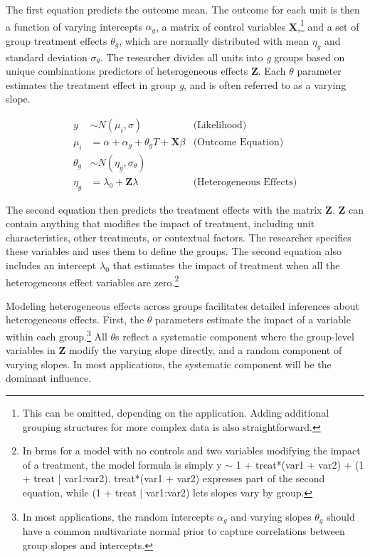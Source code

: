 \documentclass[12pt]{article}
\begin{document}
The first equation predicts the outcome mean. 
The outcome for each unit is then a function of varying intercepts $\alpha_g$, a matrix of control variables \textbf{X},\footnote{This can be omitted, depending on the application. Adding additional grouping structures for more complex data is also straightforward.} and a set of group treatment effects $\theta_g$, which are normally distributed with mean $\eta_g$ and standard deviation $\sigma_\theta$. 
The researcher divides all units into \textit{g} groups based on unique combinations predictors of heterogeneous effects \textbf{Z}. 
Each $\theta$ parameter estimates the treatment effect in group \textit{g}, and is often referred to as a varying slope. 


\begin{equation}
\begin{aligned}
y &\sim N(\mu_i, \sigma) &\text{(Likelihood)} \\
\mu_i &= \alpha + \alpha_g + \theta_g \textit{T} + \textbf{X} \beta &\text{(Outcome Equation)}  \\
\theta_g &\sim N(\eta_g, \sigma_\theta) \\ 
\eta_g &= \lambda_0 + \textbf{Z} \lambda &\text{(Heterogeneous Effects)} 
\end{aligned}
\end{equation}


The second equation then predicts the treatment effects with the matrix \textbf{Z}. 
\textbf{Z} can contain anything that modifies the impact of treatment, including unit characteristics, other treatments, or contextual factors. 
The researcher specifies these variables and uses them to define the groups.
The second equation also includes an intercept $\lambda_0$ that estimates the impact of treatment when all the heterogeneous effect variables are zero.\footnote{In brms for a model with no controls and two variables modifying the impact of a treatment, the model formula is simply y $\sim$ 1 + treat*(var1 + var2) + (1 + treat | var1:var2). treat*(var1 + var2) expresses part of the second equation, while (1 + treat | var1:var2) lets slopes vary by group.}


Modeling heterogeneous effects across groups facilitates detailed inferences about heterogeneous effects.
First, the $\theta$ parameters estimate the impact of a variable within each group.\footnote{In most applications, the random intercepts $\alpha_g$ and varying slopes $\theta_g$ should have a common multivariate normal prior to capture correlations between group slopes and intercepts.}
All $\theta$s reflect a systematic component where the group-level variables in \textbf{Z} modify the varying slope directly, and a random component of varying slopes. 
In most applications, the systematic component will be the dominant influence. 
\end{document}

